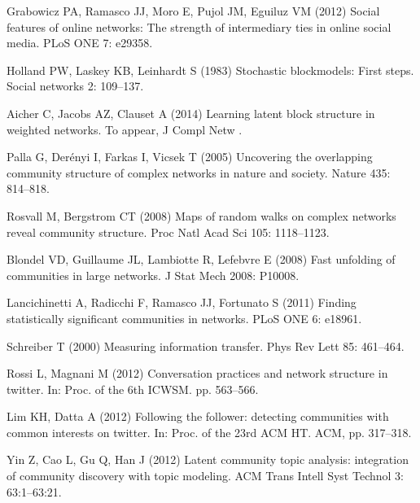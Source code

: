 \documentclass[10pt,letterpaper]{article}
\begin{document}
\begin{thebibliography}{10}
Grabowicz PA, Ramasco JJ, Moro E, Pujol JM, Eguiluz VM (2012) Social features
  of online networks: The strength of intermediary ties in online social media.
\newblock PLoS ONE 7: e29358.

Holland PW, Laskey KB, Leinhardt S (1983) Stochastic blockmodels: First steps.
\newblock Social networks 2: 109--137.

Aicher C, Jacobs AZ, Clauset A (2014) Learning latent block structure in
  weighted networks.
\newblock To appear, J Compl Netw .

Palla G, Der{\'e}nyi I, Farkas I, Vicsek T (2005) Uncovering the overlapping
  community structure of complex networks in nature and society.
\newblock Nature 435: 814--818.

Rosvall M, Bergstrom CT (2008) Maps of random walks on complex networks reveal
  community structure.
\newblock Proc Natl Acad Sci 105: 1118--1123.

Blondel VD, Guillaume JL, Lambiotte R, Lefebvre E (2008) Fast unfolding of
  communities in large networks.
\newblock J Stat Mech 2008: P10008.

Lancichinetti A, Radicchi F, Ramasco JJ, Fortunato S (2011) Finding
  statistically significant communities in networks.
\newblock PLoS ONE 6: e18961.

Schreiber T (2000) Measuring information transfer.
\newblock Phys Rev Lett 85: 461--464.

Rossi L, Magnani M (2012) Conversation practices and network structure in
  twitter.
\newblock In: Proc. of the 6th ICWSM. pp. 563--566.

Lim KH, Datta A (2012) Following the follower: detecting communities with
  common interests on twitter.
\newblock In: Proc. of the 23rd ACM HT. ACM, pp. 317--318.

Yin Z, Cao L, Gu Q, Han J (2012) Latent community topic analysis: integration
  of community discovery with topic modeling.
\newblock ACM Trans Intell Syst Technol 3: 63:1--63:21.


\end{thebibliography}
\end{document}
